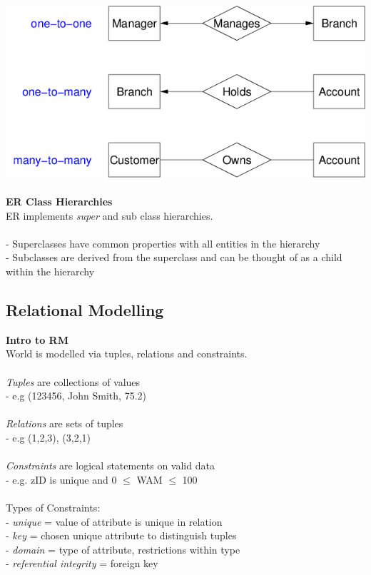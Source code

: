 \documentclass{article}
\begin{document}
\includegraphics[scale=0.4]{ER_relationships}
\\\\
\textbf{ER Class Hierarchies} \\
ER implements \emph{super} and {sub} class hierarchies.
\\\\
- Superclasses have common properties with all entities in the hierarchy \\
- Subclasses are derived from the superclass and can be thought of as a child within the hierarchy
\subsection{Relational Modelling}
\textbf{Intro to RM} \\
World is modelled via tuples, relations and constraints. \\\\
\emph{Tuples} are collections of values \\
- e.g (123456, John Smith, 75.2) \\\\
\emph{Relations} are sets of tuples \\
- e.g { (1,2,3), (3,2,1) } \\\\
\emph{Constraints} are logical statements on valid data \\
- e.g. zID is unique  and  0 $\leq$ WAM $\leq$ 100 \\
\\
Types of Constraints: \\
- \emph{unique} = value of attribute is unique in relation \\
- \emph{key} = chosen unique attribute to distinguish tuples \\
- \emph{domain} = type of attribute, restrictions within type \\
- \emph{referential integrity} = foreign key
\end{document}
